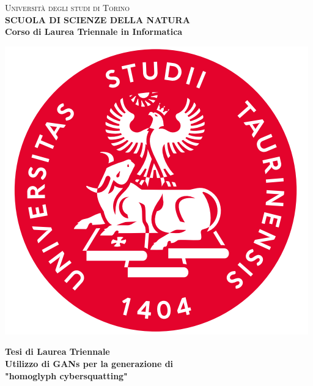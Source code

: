 \begin{titlepage}
\begin{center}
{{\Large{\textsc{Universit\`a degli studi di Torino \\}}}} \vspace{5mm} {\small{\bf SCUOLA DI SCIENZE DELLA NATURA\\ \vspace{3mm}
Corso di Laurea Triennale in Informatica}}
\vspace{5mm}
\end{center}
\begin{center}
\includegraphics[scale=.3]{head/logo.png}
\end{center}
\begin{center}
\vspace{5mm}
{\large{\bf Tesi di Laurea Triennale\\}}
\vspace{5mm}
{\LARGE{\bf Utilizzo di GANs per la generazione di \\"homoglyph cybersquatting"\\}}
\end{center}
\vspace{20mm}
\par
\noindent
\begin{minipage}[t]{0.47\textwidth}

\end{minipage}
\end{titlepage}
